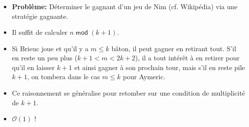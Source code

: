 \begin{frame}
    \frametitle{\problemtitle}
    \begin{itemize}
        \item<+-> \textbf{Problème:} Déterminer le gagnant d'un jeu de Nim (cf. Wikipédia) via une stratégie gagnante.
        \item<+-> Il suffit de calculer $n\;\mathsf{mod}\; (k + 1)$.
        \item<+-> Si Brieuc joue et qu'il y a $m \le k$ bâton, il peut gagner en retirant tout. S'il en reste un peu plus ($k+1<m<2k+2$), il a tout intérêt à en retirer pour qu'il en laisser $k+1$ et ainsi gagner à son prochain tour, mais s'il en reste pile $k+1$, on tombera dans le cas $m\le k$ pour Aymeric.
        \item<+-> Ce raisonnement se généralise pour retomber sur une condition de multiplicité de $k+1$.
        \item<+-> $\mathcal O(1)$ !
    \end{itemize}
\end{frame}
